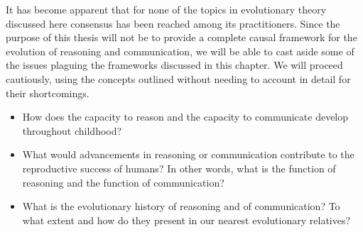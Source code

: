 It has become apparent that for none of the topics in evolutionary theory discussed here consensus has been reached among its practitioners. Since the purpose of this thesis will not be to provide a complete causal framework for the evolution of reasoning and communication, we will be able to cast aside some of the issues plaguing the frameworks discussed in this chapter. We will proceed cautiously, using the concepts outlined without needing to account in detail for their shortcomings.

\begin{itemize}
    \item How does the capacity to reason and the capacity to communicate develop throughout childhood?
    \item What would advancements in reasoning or communication contribute to the reproductive success of humans? In other words, what is the function of reasoning and the function of communication?
    \item What is the evolutionary history of reasoning and of communication? To what extent and how do they present in our nearest evolutionary relatives?
\end{itemize}
